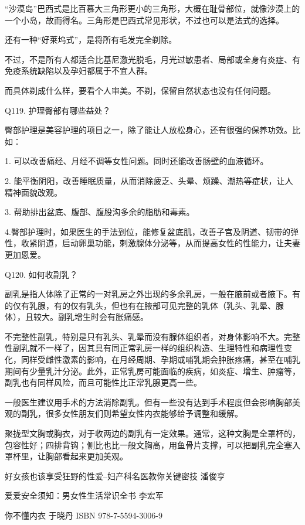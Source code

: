 \documentclass[12pt,UTF8]{ctexbook}
\begin{document}
“沙漠岛”巴西式是比百慕大三角形更小的三角形，大概在耻骨部位，就像沙漠上的一个小岛，故而得名。三角形是巴西式常见形状，不过也可以是法式的选择。

还有一种“好莱坞式”，是将所有毛发完全剃除。

不过，不是所有人都适合比基尼激光脱毛，月光过敏患者、局部或全身有炎症、有免疫系统缺陷以及孕妇都属于不宜人群。

而具体剃成什么样，要看个人审美。不剃，保留自然状态也没有任何问题。

Q119. 护理臀部有哪些益处？

臀部护理是美容护理的项目之一，除了能让人放松身心，还有很强的保养功效。比如：

1. 可以改善痛经、月经不调等女性问题。同时还能改善肠壁的血液循环。

2. 能平衡阴阳，改善睡眠质量，从而消除疲乏、头晕、烦躁、潮热等症状，让人精神面貌改观。

3. 帮助排出盆底、腹部、腹股沟多余的脂肪和毒素。

4.臀部护理时，如果医生的手法到位，能修复盆底肌，改善子宫及阴道、韧带的弹性，收紧阴道，启动卵巢功能，刺激腺体分泌等，从而提高女性的性能力，让夫妻更加恩爱。

Q120. 如何收副乳？

副乳是指人体除了正常的一对乳房之外出现的多余乳房，一般在腋前或者腋下。有的仅有乳腺，有的仅有乳头，但也有在腋部可见完整的乳体（乳头、乳晕、腺体），且较大。副乳增生时会有胀痛感。

不完整性副乳，特别是只有乳头、乳晕而没有腺体组织者，对身体影响不大。完整性副乳就不一样了，因其具有同正常乳房一样的组织构造、生理特性和病理性变化，同样受雌性激素的影响，在月经周期、孕期或哺乳期会肿胀疼痛，甚至在哺乳期间有少量乳汁分泌。此外，正常乳房可能面临的疾病，如炎症、增生、肿瘤等，副乳也有同样风险，而且可能性比正常乳腺更高一些。

一般医生建议用手术的方法消除副乳。但有一些没有达到手术程度但会影响胸部美观的副乳，很多女性朋友们则希望女性内衣能够给予调整和缓解。

聚拢型文胸或胸衣，对于收两边的副乳有一定效果。通常，这种文胸是全罩杯的，包容性好；四排背钩；侧比也比一般文胸高，用鱼骨片支撑，可以把副乳完全塞入罩杯里，让胸部看起来更加美观。



\backmatter

好女孩也该享受狂野的性爱--妇产科名医教你关键密技  潘俊亨

爱爱安全须知：男女性生活常识全书				 李宏军

你不懂内衣									 于晓丹	ISBN 978-7-5594-3006-9
\end{document}

